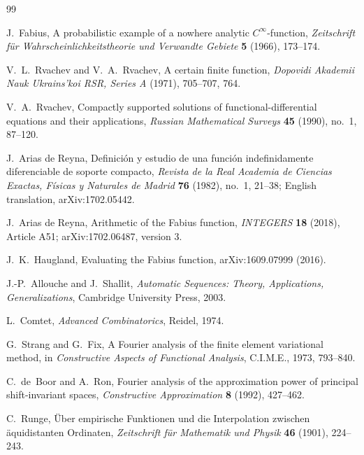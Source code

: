 \documentclass[11pt,oneside]{article}
\theoremstyle{definition}
\theoremstyle{remark}
\newcommand{\1}{\mathbf{1}}
\begin{document}
\begin{thebibliography}{99}

J.~Fabius,
\newblock A probabilistic example of a nowhere analytic $C^\infty$-function,
\newblock \emph{Zeitschrift f\"ur Wahrscheinlichkeitstheorie und Verwandte
Gebiete} \textbf{5} (1966), 173--174.

V.~L.~Rvachev and V.~A.~Rvachev,
\newblock A certain finite function,
\newblock \emph{Dopovidi Akademii Nauk Ukrains'koi RSR, Series A} (1971),
705--707, 764.

V.~A.~Rvachev,
\newblock Compactly supported solutions of functional-differential equations
and their applications,
\newblock \emph{Russian Mathematical Surveys} \textbf{45} (1990), no.~1,
87--120.

J.~Arias de Reyna,
\newblock Definici\'on y estudio de una funci\'on indefinidamente diferenciable
de soporte compacto,
\newblock \emph{Revista de la Real Academia de Ciencias Exactas, F\'isicas y
Naturales de Madrid} \textbf{76} (1982), no.~1, 21--38; English translation,
arXiv:1702.05442.

J.~Arias de Reyna,
\newblock Arithmetic of the Fabius function,
\newblock \emph{INTEGERS} \textbf{18} (2018), Article A51;
arXiv:1702.06487, version 3.

J.~K.~Haugland,
\newblock Evaluating the Fabius function,
\newblock arXiv:1609.07999 (2016).

J.-P.~Allouche and J.~Shallit,
\newblock \emph{Automatic Sequences: Theory, Applications, Generalizations},
\newblock Cambridge University Press, 2003.

L.~Comtet,
\newblock \emph{Advanced Combinatorics},
\newblock Reidel, 1974.

G.~Strang and G.~Fix,
\newblock A Fourier analysis of the finite element variational method,
\newblock in \emph{Constructive Aspects of Functional Analysis}, C.I.M.E.,
1973, 793--840.

C.~de~Boor and A.~Ron,
\newblock Fourier analysis of the approximation power of principal
shift-invariant spaces,
\newblock \emph{Constructive Approximation} \textbf{8} (1992), 427--462.

C.~Runge,
\newblock \"Uber empirische Funktionen und die Interpolation zwischen
\"aquidistanten Ordinaten,
\newblock \emph{Zeitschrift f\"ur Mathematik und Physik} \textbf{46} (1901),
224--243.


\end{thebibliography}
\end{document}

